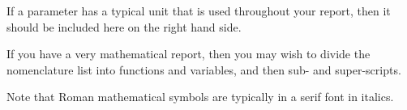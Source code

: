 \documentclass[a4paper,oneside,12pt]{book}
\numberwithin{equation}{chapter} %
\begin{document}
If a parameter has a typical unit that is used throughout your report, then it should be included here on the right hand side.

If you have a very mathematical report, then you may wish to divide the nomenclature list into functions and variables, and then sub- and super-scripts.

Note that Roman mathematical symbols are typically in a serif font in italics.
\fi

\pagestyle{general}
\mainmatter

%
%

%


%


%
\appendix
\renewcommand{\thechapter}{A\arabic{chapter}}

\end{document}
